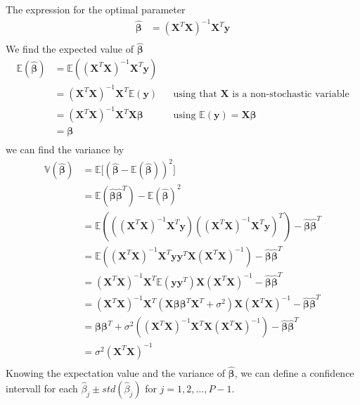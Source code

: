 The expression for the optimal parameter 
\begin{align*}
    \boldsymbol{\hat{\beta}} &= (\boldsymbol{X}^{T} \boldsymbol{X})^{-1} \boldsymbol{X}^{T} \boldsymbol{y} \\
\end{align*}
We find the expected value of $\boldsymbol{\hat{\beta}}$
\begin{align*}
    \mathbb{E}(\boldsymbol{\hat{\beta}}) &= \mathbb{E}((\boldsymbol{X}^{T} \boldsymbol{X})^{-1} \boldsymbol{X}^{T} \boldsymbol{y}) \\
    &= (\boldsymbol{X}^{T} \boldsymbol{X})^{-1} \boldsymbol{X}^{T} \mathbb{E}(\boldsymbol{y}) && \text{using that $\boldsymbol{X}$ is a non-stochastic variable} \\
    &= (\boldsymbol{X}^{T} \boldsymbol{X})^{-1} \boldsymbol{X}^{T} \boldsymbol{X} \boldsymbol{\beta} && \text{using $\mathbb{E}(\boldsymbol{y}) = \boldsymbol{X} \boldsymbol{\beta}$} \\
    &= \boldsymbol{\beta} \\
\end{align*}
we can find the variance by 
\begin{align*}
    \mathbb{V}(\boldsymbol{\hat{\beta}}) &= \mathbb{E} \big[ (\boldsymbol{\hat{\beta}} - \mathbb{E}(\boldsymbol{\hat{\beta}}))^{2} \big] \\
    &= \mathbb{E} (\boldsymbol{\hat{\beta}} \boldsymbol{\hat{\beta}}^{T}) - \mathbb{E}(\boldsymbol{\hat{\beta}})^{2}  \\
    &= \mathbb{E} (((\boldsymbol{X}^{T} \boldsymbol{X})^{-1} \boldsymbol{X}^{T} \boldsymbol{y}) ((\boldsymbol{X}^{T} \boldsymbol{X})^{-1} \boldsymbol{X}^{T} \boldsymbol{y})^{T}) - \boldsymbol{\hat{\beta}}\boldsymbol{\hat{\beta}}^{T}  \\
    &= \mathbb{E} ((\boldsymbol{X}^{T} \boldsymbol{X})^{-1} \boldsymbol{X}^{T} \boldsymbol{y} \boldsymbol{y}^{T} \boldsymbol{X} (\boldsymbol{X}^{T} \boldsymbol{X})^{-1}) - \boldsymbol{\hat{\beta}}\boldsymbol{\hat{\beta}}^{T}  \\
    &= (\boldsymbol{X}^{T} \boldsymbol{X})^{-1} \boldsymbol{X}^{T} \mathbb{E} (\boldsymbol{y} \boldsymbol{y}^{T}) \boldsymbol{X} (\boldsymbol{X}^{T} \boldsymbol{X})^{-1} - \boldsymbol{\hat{\beta}}\boldsymbol{\hat{\beta}}^{T}  \\
    &= (\boldsymbol{X}^{T} \boldsymbol{X})^{-1} \boldsymbol{X}^{T} (\boldsymbol{X} \boldsymbol{\beta} \boldsymbol{\beta}^{T} \boldsymbol{X}^{T} + \sigma^{2}) \boldsymbol{X} (\boldsymbol{X}^{T} \boldsymbol{X})^{-1} - \boldsymbol{\hat{\beta}}\boldsymbol{\hat{\beta}}^{T}  \\
    &= \boldsymbol{\beta} \boldsymbol{\beta}^{T} + \sigma^{2}((\boldsymbol{X}^{T} \boldsymbol{X})^{-1} \boldsymbol{X}^{T} \boldsymbol{X} (\boldsymbol{X}^{T} \boldsymbol{X})^{-1}) - \boldsymbol{\hat{\beta}}\boldsymbol{\hat{\beta}}^{T}  \\
    &= \sigma^{2}(\boldsymbol{X}^{T} \boldsymbol{X})^{-1} \\
\end{align*}
Knowing the expectation value and the variance of $\boldsymbol{\hat{\beta}}$, we can define a confidence intervall for each $\hat{\beta}_{j} \pm std(\hat{\beta}_j)$ for $j=1, 2, \hdots, P-1$.

